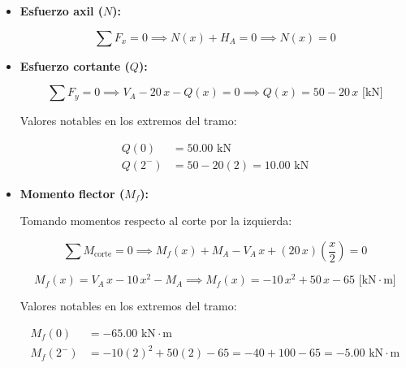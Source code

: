 \begin{itemize}

    \item \textbf{Esfuerzo axil ($N$):}

          \begin{equation}

              \sum F_x = 0 \implies N(x) + H_A = 0 \implies \boxed{N(x) = 0}

          \end{equation}



    \item \textbf{Esfuerzo cortante ($Q$):}

          \begin{equation}

              \sum F_y = 0 \implies V_A - 20\,x - Q(x) = 0 \implies \boxed{Q(x) = 50 - 20\,x\text{ [kN]}}

          \end{equation}

          Valores notables en los extremos del tramo:

          \begin{align*}

              Q(0)   & = 50.00\text{ kN}              \\

              Q(2^-) & = 50 - 20(2) = 10.00\text{ kN}

          \end{align*}



    \item \textbf{Momento flector ($M_f$):}

          Tomando momentos respecto al corte por la izquierda:

          \begin{equation}

              \sum M_{\text{corte}} = 0 \implies M_f(x) + M_A - V_A\,x + (20\,x)\left(\frac{x}{2}\right) = 0

          \end{equation}

          \begin{equation}

              M_f(x) = V_A\,x - 10\,x^2 - M_A \implies \boxed{M_f(x) = -10\,x^2 + 50\,x - 65\text{ [kN}\cdot\text{m]}}

          \end{equation}

          Valores notables en los extremos del tramo:

          \begin{align*}

              M_f(0)   & = -65.00\text{ kN}\cdot\text{m}                                         \\

              M_f(2^-) & = -10(2)^2 + 50(2) - 65 = -40 + 100 - 65 = -5.00\text{ kN}\cdot\text{m}

          \end{align*}

\end{itemize}



